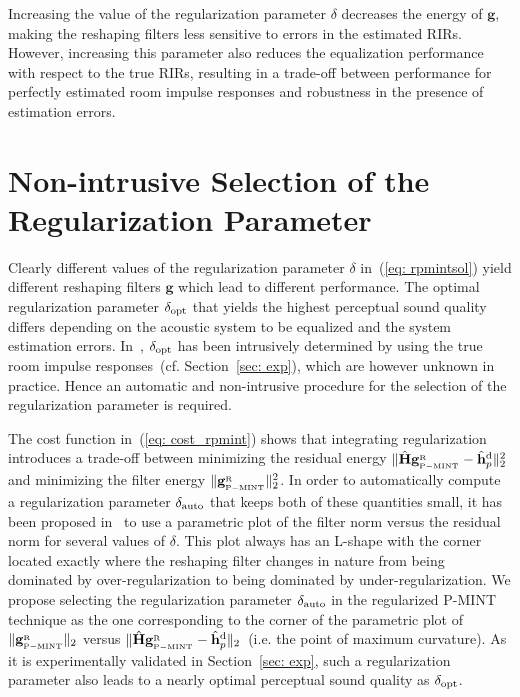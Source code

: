 \documentclass{article}
\begin{document}
Increasing the value of the regularization parameter $\delta$ decreases the energy of $\mathbf{g}$, making the reshaping filters less sensitive to errors in the estimated RIRs. 
However, increasing this parameter also reduces the equalization performance with respect to the true RIRs, resulting in a trade-off between performance for perfectly estimated room impulse responses and robustness in the presence of estimation errors.

\section{Non-intrusive Selection of the Regularization Parameter}
Clearly different values of the regularization parameter $\delta$ in~(\ref{eq: rpmintsol}) yield different reshaping filters $\mathbf{g}$ which lead to different performance. 
The optimal regularization parameter $\delta_{\rm opt}$ that yields the highest perceptual sound quality differs depending on the acoustic system to be equalized and the system estimation errors. 
In~\cite{Kodrasi_ICASSP_2012}, $\delta_{\rm opt}$ has been intrusively determined by using the true room impulse responses~(cf. Section~\ref{sec: exp}), which are however unknown in practice.
Hence an automatic and non-intrusive procedure for the selection of the regularization parameter is required.

The cost function in~(\ref{eq: cost_rpmint}) shows that integrating regularization introduces a trade-off between minimizing the residual energy $\|\hat{\mathbf{H}}\mathbf{g}_{{}_{\rm P-MINT}}^{_{\rm R}} - \hat{\mathbf{h}}_p^{\rm d}\|_2^2$ and minimizing the filter energy $\|\mathbf{g}_{{}_{\rm P-MINT}}^{_{\rm R}}\|_2^2$.
In order to automatically compute a regularization parameter $\delta_{\rm auto}$ that keeps both of these quantities small, it has been proposed in~\cite{Hansen_1993} to use a parametric plot of the filter norm versus the residual norm for several values of $\delta$.
This plot always has an L-shape with the corner located exactly where the reshaping filter changes in nature from being dominated by over-regularization to being dominated by under-regularization. 
We propose selecting the regularization parameter $\delta_{\rm auto}$ in the regularized P-MINT technique as the one corresponding to the corner of the parametric plot of $\|\mathbf{g}_{{}_{\rm P-MINT}}^{_{\rm R}}\|_2$ versus $\|\hat{\mathbf{H}}\mathbf{g}_{{}_{\rm P-MINT}}^{_{\rm R}} - \hat{\mathbf{h}}_p^{\rm d}\|_2$~(i.e. the point of maximum curvature). 
As it is experimentally validated in Section~\ref{sec: exp}, such a regularization parameter also leads to a nearly optimal perceptual sound quality as $\delta_{\rm opt}$.
\end{document}
